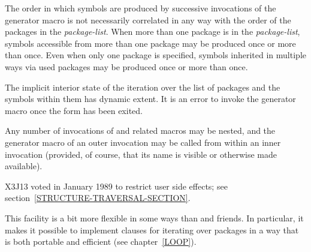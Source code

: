 \begin{defmac}
The order in which symbols are produced by successive invocations
of the generator macro is not necessarily correlated in any way
with the order of the packages in the \emph{package-list}.
When more than one package is in the \emph{package-list},
symbols accessible from more than one package may be produced
once or more than once.  Even when only one package is specified,
symbols inherited in multiple ways via used packages may be
produced once or more than once.

The implicit interior state of the iteration over the list of packages
and the symbols within them has dynamic extent.
It is an error to invoke the generator macro
once the  form has been exited.

Any number of invocations of 
and related macros may be nested, and the generator macro of an
outer invocation may be called from within an inner invocation
(provided, of course, that its name is visible or otherwise made available).

X3J13 voted in January 1989
to restrict user side effects; see section~\ref{STRUCTURE-TRAVERSAL-SECTION}.

\beforenoterule
\begin{rationale}
This facility is a bit more flexible in some ways than 
and friends.
In particular, it makes it possible to implement 
clauses for iterating over packages in a way that is both portable
and efficient (see chapter~\ref{LOOP}).
\end{rationale}
\afternoterule
\end{defmac}
\fi